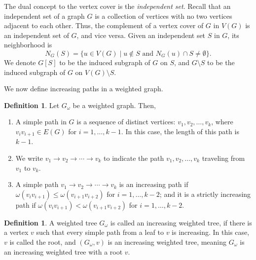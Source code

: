 \documentclass[12pt,amscd]{amsart}
\theoremstyle{definition}
\newtheorem{defn}[thm]{Definition}
\begin{document}
 
The dual concept to the vertex cover is the {\it independent set}. Recall that an independent set of a graph $G$ is a collection of vertices with no two vertices adjacent to each other. Thus, the  complement of a vertex cover of $G$ in $V(G)$ is an independent set of $G$, and vice versa. Given  an independent set $S$ in $G$, its neighborhood is
$$N_G(S) = \{u\in V(G) \mid u \notin S \text{ and } N_G(u)\cap S \ne \emptyset\}.$$
We denote $G[S]$ to be the induced subgraph of $G$ on $S$, and  $G\setminus S$ to be  the induced subgraph of $G$ on $V (G)\setminus S$.

\medskip

We now define increasing paths in a weighted graph.

\begin{defn} Let $G_\omega$ be a weighted graph. Then,
\begin{enumerate}
    \item A simple path in $G$ is a sequence of distinct vertices: $v_1,v_2,\ldots, v_k$, where $v_iv_{i+1}\in E(G)$ for $i=1,\ldots,k-1$. In this case, the length of this path is $k-1$.
    \item We write $v_1\to v_2\to \cdots \to v_k$ to indicate the path $v_1,v_2,\ldots, v_k$ traveling from $v_1$ to $v_k$.
    \item A simple path $v_1\to v_2\to\cdots\to v_k$ is an increasing path if $\omega(v_iv_{i+1}) \leqslant \omega(v_{i+1}v_{i+2})$ for $i=1,\ldots,k-2$; and it is a strictly increasing path if $\omega(v_iv_{i+1}) < \omega(v_{i+1}v_{i+2})$ for $i=1,\ldots,k-2$.
\end{enumerate}
\end{defn}



\begin{defn} A weighted tree $G_\omega$ is called an increasing weighted tree, if there is a vertex $v$ such that  every simple path from a leaf to $v$ is increasing. In this case,  $v$ is called the root, and  $(G_\omega,v)$ is an increasing weighted tree, meaning $G_\omega$ is an increasing weighted tree with a root $v$.
\end{defn}
\end{document}
